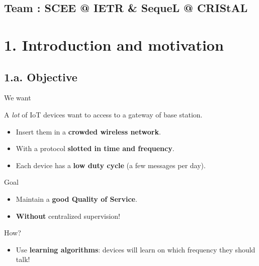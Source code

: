 \documentclass[12pt,english,ignorenonframetext,]{beamer}
\providecommand{\tightlist}{%
  \setlength{\itemsep}{0pt}\setlength{\parskip}{0pt}}
\begin{document}
\subsection*{\hfill{}Team {:} SCEE @ IETR \& SequeL @ CRIStAL\hfill{}}




\section{\hfill{}1. Introduction and motivation\hfill{}}

\subsection{\hfill{}1.a. Objective\hfill{}}

\begin{frame}{We want}

  A \emph{lot} of IoT devices want to access to a gateway of base station.

\begin{itemize}
\tightlist
\item
  Insert them in a \textbf{crowded wireless network}.
\item
  With a protocol \textbf{slotted in time and frequency}.
\item
  Each device has a \textbf{low duty cycle} (a few messages per day).
\end{itemize}

\pause

\begin{block}{Goal}

\begin{itemize}
\tightlist
\item
  Maintain a \textbf{good Quality of Service}.
\item
  \textbf{Without} centralized supervision!
\end{itemize}

\end{block}

\pause

\begin{block}{How?}

\begin{itemize}
\tightlist
\item
  Use \textbf{learning algorithms}: devices will learn on which
  frequency they should talk!
\end{itemize}

\end{block}

\end{frame}
\end{document}
